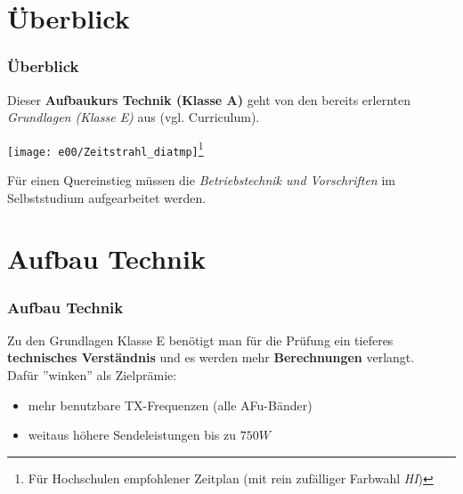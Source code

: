 

\subtitle{Technik Klasse A 00: \\
          Curriculum \& Organisatorisches \\[2em]}
\date{Stand 16.04.2015}



\section{Überblick}

\begin{frame}
    \frametitle{Überblick}

    Dieser \textbf{Aufbaukurs Technik (Klasse A)} geht von den bereits erlernten
    \emph{Grundlagen (Klasse E)} aus (vgl. Curriculum\hyperlink{refs}{\cite{curr}}).

    \vspace{2em}

    \texttt{[image: e00/Zeitstrahl\_diatmp]}\footnote{Für
    Hochschulen empfohlener Zeitplan \tiny (mit rein zufälliger Farbwahl \emph{HI})}

    \vspace{1em}

    Für einen Quereinstieg müssen die \emph{Betriebstechnik und Vorschriften} im
    Selbststudium aufgearbeitet werden.

\end{frame}

\section{Aufbau Technik}

\begin{frame}
    \frametitle{Aufbau Technik}
    
    Zu den Grundlagen Klasse E benötigt man für die Prüfung ein tieferes
    \textbf{technisches Verständnis} und es werden mehr \textbf{Berechnungen}
    verlangt. \\[2em]

    Dafür ''winken'' als Zielprämie:

    \begin{itemize}
        \item mehr benutzbare TX-Frequenzen (alle AFu-Bänder)
        \item weitaus höhere Sendeleistungen bis zu $750W$
    \end{itemize}

\end{frame}


